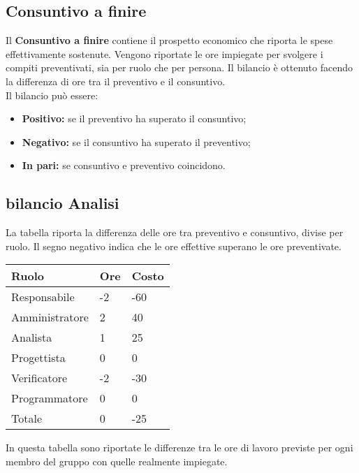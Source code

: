 \begin{flushleft}
\chapter{Consuntivo a finire}
Il \textbf{Consuntivo a finire} contiene il prospetto economico che riporta le spese effettivamente sostenute. Vengono riportate le ore impiegate per svolgere i compiti preventivati, sia per
ruolo che per persona. Il bilancio è ottenuto facendo la differenza di ore tra il preventivo e il consuntivo.\\
Il bilancio può essere:
\begin{itemize}
    \item \textbf{Positivo:} se il preventivo ha superato il consuntivo;
    \item \textbf{Negativo:} se il consuntivo ha superato il preventivo;
    \item \textbf{In pari:} se consuntivo e preventivo coincidono.
\end{itemize}
\section{bilancio Analisi}
La tabella riporta la differenza delle ore tra preventivo e consuntivo, divise per ruolo. Il segno negativo indica che le ore effettive superano le ore preventivate.    
\begin{table}[h]
    \begin{tabular}{|l|l|l|}
    \hline
    Ruolo          & Ore & Costo \\ \hline
    Responsabile   & -2  & -60   \\ \hline
    Amministratore & 2   & 40    \\ \hline
    Analista       & 1   & 25    \\ \hline
    Progettista    & 0   & 0     \\ \hline
    Verificatore   & -2  & -30   \\ \hline
    Programmatore  & 0   & 0     \\ \hline
    Totale         & 0   & -25   \\ \hline
    \end{tabular}
    \end{table}
In questa tabella  sono riportate le differenze tra le ore di lavoro previste per ogni membro del gruppo con quelle realmente impiegate.


\end{flushleft}
